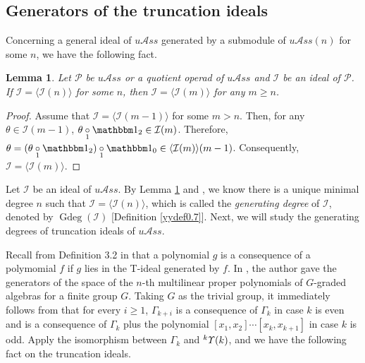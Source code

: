 \documentclass{amsart}
\newtheorem{thm}{Theorem}[section]
\newtheorem{lem}[thm]{Lemma}
\theoremstyle{definition}
\theoremstyle{remark}
\numberwithin{equation}{section}
\def\S{\mathbb{S}}
\def\gd{\operatorname{Gdeg}}
\newcommand{\lr}[1]{\langle #1 \rangle}
\newcommand{\ucr}[1]{\underset{#1}{\circ}}
\newcommand{\up}[1]{{^{#1}{\it \!\Upsilon}}}
\def \uas{u\mathcal{A}ss}
\def \I{\mathcal{I}}
\def \ip{{\mathcal{P}}}
\def \1{\mathbbm 1}
\def \S{\mathbb{S}}
\begin{document}
\subsection{Generators of the truncation ideals} 
\label{yysec3.2}
Concerning a general ideal of $\uas$ 
generated by a submodule of $\uas(n)$ for some $n$, we 
have the following fact. 


\begin{lem}
\label{yylem3.6}
Let $\ip$ be \; $\uas$ or a quotient operad of \; $\uas$ and 
$\I$ be an ideal of $\ip$. If $\I=\lr{\I(n)}$ 
for some $n$, then $\I=\lr{\I(m)}$ for any $m\ge n$.
\end{lem}

\begin{proof} 
Assume that $\I=\langle \I(m-1)\rangle$ for some $m>n$. Then, 
for any $\theta\in \I(m-1)$, $\theta\ucr{1} \1_2\in \I(m)$.
Therefore, $\theta=(\theta\ucr{1} \1_2)\ucr{1} \1_0\in \langle 
\I(m)\rangle(m-1)$. Consequently, $\I=\langle \I(m)\rangle$.
\end{proof}

Let $\I$ be an ideal of $\uas$. By Lemma \ref{yylem3.6} and
\cite[Theorem 0.3(2)]{BXYZZ}, we 
know there is a unique minimal degree $n$ such that 
$\I=\lr{\I(n)}$, which is called the \textit{generating degree} 
of $\I$, denoted by $\gd(\I)$ [Definition \ref{yydef0.7}]. 
Next, we will study the generating degrees of truncation ideals 
of $\uas$. 

Recall from Definition 3.2 in \cite{GMZ} that a polynomial 
$g$ is a consequence of a polymomial $f$ if $g$ lies in 
the T-ideal generated by $f$. In \cite{Ma3}, the author gave 
the generators of the space of the $n$-th multilinear proper 
polynomials of $G$-graded algebras for a finite group $G$. 
Taking $G$ as the trivial group, it immediately follows from 
\cite[Lemma 2.2]{Ma3} that for every $i\ge 1$, $\Gamma_{k+i}$ 
is a consequence of $\Gamma_{k}$ in case $k$ is even
and is a consequence of $\Gamma_{k}$ plus the polynomial 
$[x_1, x_2]\cdots[x_k, x_{k+1}]$ in case $k$ is odd.
Apply the isomorphism between $\Gamma_k$ and $\up{k}(k)$, 
and we have the following fact on the truncation ideals.
\end{document}
